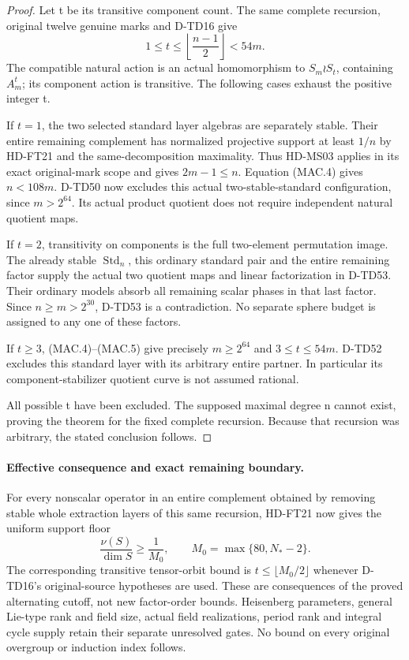 \begin{proof}
Let t be its transitive component count. The same complete recursion,
original twelve genuine marks and D-TD16 give
\[
     1\le t\le\left\lfloor\frac{n-1}{2}\right\rfloor<54m.
 \tag{MAC.5}
\]
The compatible natural action is an actual homomorphism to
\(S_m\wr S_t\), containing \(A_m^t\); its component action
is transitive. The following cases exhaust the positive integer t.

If \(t=1\), the two selected standard layer algebras are separately
stable. Their entire remaining complement has normalized projective
support at least \(1/n\) by HD-FT21 and the same-decomposition
maximality. Thus HD-MS03 applies in its exact original-mark scope
and gives \(2m-1\le n\). Equation (MAC.4) gives \(n<108m\).
D-TD50 now excludes this actual two-stable-standard configuration,
since \(m>2^{64}\). Its actual product quotient does not require
independent natural quotient maps.

If \(t=2\), transitivity on components is the full two-element
permutation image. The already stable \(\operatorname{Std}_n\),
this ordinary standard pair and the entire remaining factor supply
the actual two quotient maps and linear factorization in D-TD53.
Their ordinary models absorb all remaining scalar phases in that
last factor. Since \(n\ge m>2^{30}\), D-TD53 is a contradiction.
No separate sphere budget is assigned to any one of these factors.

If \(t\ge3\), (MAC.4)--(MAC.5) give precisely
\(m\ge2^{64}\) and \(3\le t\le54m\). D-TD52 excludes this
standard layer with its arbitrary entire partner. In particular its
component-stabilizer quotient curve is not assumed rational.

All possible t have been excluded. The supposed maximal degree n
cannot exist, proving the theorem for the fixed complete recursion.
Because that recursion was arbitrary, the stated conclusion follows.
\end{proof}

\paragraph{Effective consequence and exact remaining boundary.}
For every nonscalar operator in an entire complement obtained by
removing stable whole extraction layers of this same recursion,
HD-FT21 now gives the uniform support floor
\[
 \frac{\nu(S)}{\dim S}\ge\frac1{M_0},\qquad
                M_0=\max\{80,N_*-2\}.
 \tag{MAC.6}
\]
The corresponding transitive tensor-orbit bound is
\(t\le\lfloor M_0/2\rfloor\) whenever D-TD16's original-source
hypotheses are used. These are consequences of the proved alternating
cutoff, not new factor-order bounds. Heisenberg parameters, general
Lie-type rank and field size, actual field realizations, period rank
and integral cycle supply retain their separate unresolved gates.
No bound on every original overgroup or induction index follows.

